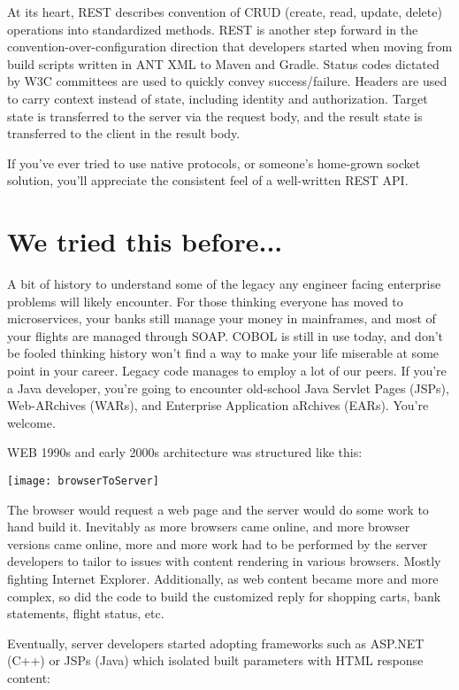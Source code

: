 At its heart, REST describes convention of CRUD (create, read, update, delete) operations into standardized methods.  REST is another step forward in the convention-over-configuration direction that developers started when moving from build scripts written in ANT XML to Maven and Gradle.  Status codes dictated by W3C committees are used to quickly convey success/failure.  Headers are used to carry context instead of state, including identity and authorization.  Target state is transferred to the server via the request body, and the result state is transferred to the client in the result body.

If you've ever tried to use native protocols, or someone's home-grown socket solution, you'll appreciate the consistent feel of a well-written REST API.

\section{We tried this before...}

A bit of history to understand some of the legacy any engineer facing enterprise problems will likely encounter.  For those thinking everyone has moved to microservices, your banks still manage your money in mainframes, and most of your flights are managed through SOAP.  COBOL is still in use today, and don't be fooled thinking history won't find a way to make your life miserable at some point in your career.  Legacy code manages to employ a lot of our peers.  If you're a Java developer, you're going to encounter old-school Java Servlet Pages (JSPs), Web-ARchives (WARs), and Enterprise Application aRchives (EARs).  You're welcome.

WEB 1990s and early 2000s architecture was structured like this:

\texttt{[image: browserToServer]}

The browser would request a web page and the server would do some work to hand build it.  Inevitably as more browsers came online, and more browser versions came online, more and more work had to be performed by the server developers to tailor to issues with content rendering in various browsers. Mostly fighting Internet Explorer.  Additionally, as web content became more and more complex, so did the code to build the customized reply for shopping carts, bank statements, flight status, etc.

Eventually, server developers started adopting frameworks such as ASP.NET (C++) or JSPs (Java) which isolated built parameters with HTML response content:

